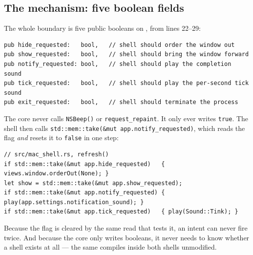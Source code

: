 \subsection{The mechanism: five boolean fields}

The whole boundary is five public booleans on , from  lines 22--29:

\begin{lstlisting}[caption={Every side effect the core wants is a public boolean field.}]
pub hide_requested:   bool,   // shell should order the window out
pub show_requested:   bool,   // shell should bring the window forward
pub notify_requested: bool,   // shell should play the completion sound
pub tick_requested:   bool,   // shell should play the per-second tick sound
pub exit_requested:   bool,   // shell should terminate the process
\end{lstlisting}

The core never calls \texttt{NSBeep()} or \texttt{request\_repaint}. It only ever writes
\texttt{true}. The shell then calls \texttt{std::mem::take(\&mut app.notify\_requested)},
which reads the flag \emph{and} resets it to \texttt{false} in one step:

\begin{lstlisting}[caption={Both shells drain the flags identically, at the end of a frame.}]
// src/mac_shell.rs, refresh()
if std::mem::take(&mut app.hide_requested)   { views.window.orderOut(None); }
let show = std::mem::take(&mut app.show_requested);
if std::mem::take(&mut app.notify_requested) { play(app.settings.notification_sound); }
if std::mem::take(&mut app.tick_requested)   { play(Sound::Tink); }
\end{lstlisting}

Because the flag is cleared by the same read that tests it, an intent can never fire
twice. And because the core only writes booleans, it never needs to know whether a
shell exists at all --- the same  compiles inside both shells unmodified.

